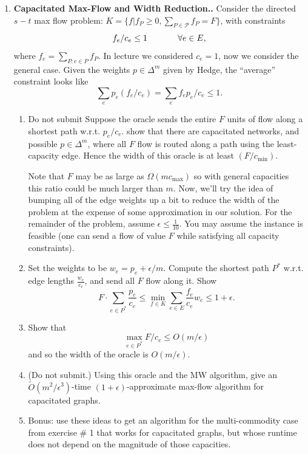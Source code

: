 \documentclass{article}
\theoremstyle{plain}
\newcommand\litem[1]{\item{\bfseries#1.\space}}
\begin{document}
\begin{enumerate}
\begin{enumerate}
    \item Show that you can in fact find LPs for the above such that the optimal solution for the dual for the first LP is a solution to the second LP.
    \item (Do not submit.) Use weak duality to infer the first part of
      the minimax theorem, and strong duality to infer the second
      part.
      \end{enumerate}
      \litem{Capacitated Max-Flow and Width Reduction.} Consider the directed $s-t$ max flow problem: $K =  \{f | f_P \geq 0, \sum_{P \in \mathcal{P}} f_P = F\}$, with constraints
      \[f_e / c_e \leq 1 \hspace{.5in} \forall e\in E,\]
      where $f_e = \sum_{ P : e \in P} f_P$. In lecture we considered $c_e = 1$, now we consider the general case. Given the weights $p \in \Delta^m$ given by Hedge, the ``average'' constraint looks like
      \[\sum_e p_e (f_e/c_e) = \sum_e f_e p_e/c_e \leq 1.\]
      \begin{enumerate}
      \item {Do not submit} Suppose the oracle sends the entire $F$ units of flow along a shortest path w.r.t. $p_e / c_e$. show that there are capacitated networks, and possible $p\in \Delta^m$, where all $F$ flow is routed along a path using the least-capacity edge. Hence the width of this oracle is at least $(F/c_{\min})$.

        Note that $F$ may be as large as $\Omega(m c_{\max})$ so with
        general capacities this ratio could be much larger than
        $m$. Now, we'll try the idea of bumping all of the edge
        weights up a bit to reduce the width of the problem at the
        expense of some approximation in our solution.  For the
        remainder of the problem, assume $\epsilon \leq
        \frac{1}{10}$. You may assume the instance is feasible (one
        can send a flow of value $F$ while satisfying all capacity
        constraints).

      \item Set the weights to be $w_e = p_e + \epsilon/m$. Compute the shortest path $P^*$ w.r.t. edge lengths $\frac{w_e}{c_e}$, and send all $F$ flow along it. Show
        \[F \cdot \sum_{e \in P^*} \frac{p_e}{c_e} \leq \min_{f\in K} \sum_{e\in E} \frac{f_e}{c_e} w_e \leq 1 + \epsilon.\]
      \item Show that
        \[ \max_{e\in P^*} F/c_e \leq O(m/\epsilon)\]
        and so the width of the oracle is $O(m/\epsilon)$.
      \item (Do not submit.) Using this oracle and the MW algorithm,
        give an $\tilde{O}(m^2/\epsilon^3)$-time
        $(1+\epsilon)$-approximate max-flow algorithm for capacitated
        graphs.
      \item Bonus: use these ideas to get an algorithm for the
        multi-commodity case from exercise \# 1 that works for
        capacitated graphs, but whose runtime does not depend on the
        magnitude of those capacities.


\end{enumerate}
\end{enumerate}
\end{document}
